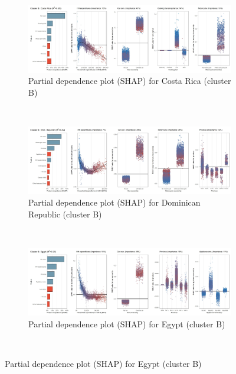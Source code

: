 \begin{figure}[ht!]\ContinuedFloat
    \centering
   \begin{subfigure}[b]{\textwidth}
   \centering
         \caption{Partial dependence plot (SHAP) for Costa Rica (cluster B)}
         \label{fig:5b_CRI}
         \includegraphics[width=\textwidth]{Figure 5b/Figure_5b_CRI}
    \end{subfigure}
    \\
    \vspace{0.5cm}
    \begin{subfigure}[b]{\textwidth}
   \centering
         \caption{Partial dependence plot (SHAP) for Dominican Republic (cluster B)}
         \label{fig:5b_DOM}
         \includegraphics[width=\textwidth]{Figure 5b/Figure_5b_DOM} 
         \end{subfigure}
    \\
    \vspace{0.5cm}
   \begin{subfigure}[b]{\textwidth}        
   \centering
         \caption{Partial dependence plot (SHAP) for Egypt (cluster B)}
         \label{fig:5b_EGY}
         \includegraphics[width=\textwidth]{Figure 5b/Figure_5b_EGY}
         \end{subfigure}
    \\
    \vspace{0.5cm}
   

\end{figure}
